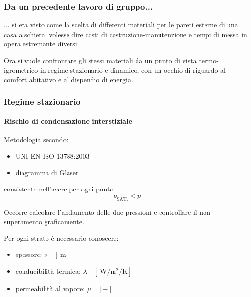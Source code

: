 \documentclass[aspectratio=141,10pt]{beamer}
\begin{document}
\begin{frame}
    \frametitle{Da un precedente lavoro di gruppo...}
    ... si era visto come la scelta di differenti materiali per le pareti esterne di una casa a schiera, volesse dire costi di costruzione-manutenzione e tempi di messa in opera estremante diversi.
    \vspace{2cm}

    Ora si vuole confrontare gli stessi materiali da un punto di vista termo-igrometrico in regime stazionario e dinamico, con un occhio di riguardo al comfort abitativo e al dispendio di energia.
\end{frame}
\begin{frame}
    \frametitle{Regime stazionario}
    \framesubtitle{Rischio di condensazione interstiziale} 
    Metodologia secondo:
    \begin{itemize}
        \item UNI EN ISO 13788:2003
        \item diagramma di Glaser
    \end{itemize}
    consistente nell'avere per ogni punto:
        \begin{equation*}
            p_{\text{SAT.}} < p 
        \end{equation*}
\pause
\vspace{1cm}

Occorre calcolare l'andamento delle due pressioni e controllare il non superamento graficamente. 

Per ogni strato è necessario conoscere:
\begin{itemize}
    \item spessore: $s \quad [\SI{}{\metre}]$
    \item conducibilità termica: $\lambda \quad [\SI{}{\watt\per\metre\squared\per\kelvin}]$
    \item permeabilità al vapore: $\mu \quad [-]$
\end{itemize}    
\end{frame}
\end{document}
